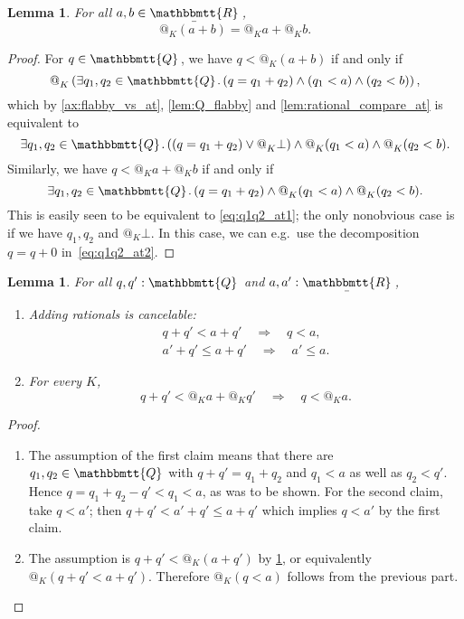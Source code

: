 \documentclass[11pt, oneside, article]{memoir}
\makeatletter
\theoremstyle{plain}
\newtheorem{lemma}[theorem]{Lemma}
\theoremstyle{definition}
\theoremstyle{remark}
\newcommand{\ubar}[1]{\underaccent{\bar}{#1}}
\newcommand{\internal}[1]{\raisebox{-.03ex}{$\mathbbmtt{#1}$}}
\newcommand{\hs}{\hspace{1.1pt}}
\newcommand{\tQQ}{\internal{Q}\hs}
\newcommand{\tRR}{\internal{R}\hs}
\newcommand{\tLR}{\ubar{\tRR}\hs}
\newcommand{\AtSymbol}{{@}}
\newcommand{\At}[2][]{\AtSymbol^{#1}_{#2}}
\makeatother
\begin{document}
\begin{lemma}
	\label{lem.at_plus_commute}
	For all $a,b\in\tLR$,
	\[
		\At{K}(a + b) = \At{K} a + \At{K} b.
	\]
\end{lemma}

\begin{proof}
	For $q\in\tQQ$, we have $q < \At{K}(a + b)$ if and only if
	\[
		\At{K}\left(\exists q_1, q_2\in\tQQ\ldotp (q = q_1 + q_2) \land (q_1 < a) \land (q_2 < b)\right),
	\]
	which by \cref{ax:flabby_vs_at}, \cref{lem:Q_flabby} and \cref{lem:rational_compare_at} is equivalent to
	\begin{equation}
		\label{eq:q1q2_at1}
		\exists q_1, q_2\in\tQQ\ldotp \left((q = q_1 + q_2) \lor \At{K} \bot\right) \land \At{K}(q_1 < a) \land \At{K}(q_2 < b).
	\end{equation}
	Similarly, we have $q < \At{K} a + \At{K} b$ if and only if
	\begin{equation}
		\label{eq:q1q2_at2}
		\exists q_1, q_2 \in \tQQ \ldotp (q = q_1 + q_2) \land \At{K}(q_1 < a) \land \At{K}(q_2 < b).
	\end{equation}
	This is easily seen to be equivalent to \eqref{eq:q1q2_at1}; the only nonobvious case is if we have $q_1, q_2$ and $\At{K} \bot$. In this case, we can e.g.~use the decomposition $q = q + 0$ in~\eqref{eq:q1q2_at2}.
\end{proof}

\begin{lemma}
	\label{lem:subtract_q}
	For all $q,q':\tQQ$ and $a,a' : \tLR$,
	\begin{enumerate}
	\item Adding rationals is \emph{cancelable}:
		\begin{gather*}
			q + q' < a + q' \quad \Longrightarrow \quad q < a,\\
			a' + q' \leq a + q'\quad\Longrightarrow\quad a'\leq a.
		\end{gather*}
	\item For every $K$,
		\begin{equation}
			\label{eq.cancel_at_q'}
			q + q' < \At{K} a + \At{K} q' \quad \Longrightarrow \quad q < \At{K} a.
		\end{equation}
	\end{enumerate}
\end{lemma}

\begin{proof}
	\begin{enumerate}
		\item The assumption of the first claim means that there are $q_1,q_2\in\tQQ$ with $q + q' = q_1 + q_2$ and $q_1 < a$ as well as $q_2 < q'$. Hence $q = q_1 + q_2 - q' < q_1 < a$, as was to be shown. For the second claim, take $q<a'$; then $q+q'<a'+q'\leq a+q'$ which implies $q<a'$ by the first claim.
		\item The assumption is $q + q' < \At{K}(a + q')$ by \cref{lem.at_plus_commute}, or equivalently $\At{K}(q + q' < a + q')$. Therefore $\At{K}(q < a)$ follows from the previous part. \qedhere
	\end{enumerate}
\end{proof}
\end{document}

